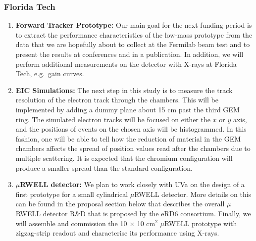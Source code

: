 \subsubsection{Florida Tech} 
\begin{enumerate}
\item \textbf{Forward Tracker Prototype:} Our main goal for the next funding period is to extract the performance characteristics of the low-mass prototype from the data that we are hopefully about to collect at the Fermilab beam test and to present the results at conferences and in a publication. In addition, we will perform additional measurements on the detector with X-rays at Florida Tech, e.g.\ gain curves.
%
\item \textbf{EIC Simulations:} The next step in this study is to measure the track resolution of the electron track through the chambers. This will be implemented by adding a dummy plane about 15 cm past the third GEM ring. The simulated electron tracks will be focused on either the $x$ or $y$ axis, and the positions of events on the chosen axis will be histogrammed. In this fashion, one will be able to tell how the reduction of material in the GEM chambers affects the spread of position values read after the chambers due to multiple scattering. It is expected that the chromium configuration will produce a smaller spread than the standard configuration.
%
\item \textbf{$\mu$RWELL detector:} We plan to work closely with UVa on the design of a first prototype for a small cylindrical $\mu$RWELL detector. More details on this can be found in the proposal section below that describes the overall $\mu$RWELL detector R\&D that is proposed by the eRD6 consortium. Finally, we will assemble and commission the 10 $\times$ 10 cm$^2$ $\mu$RWELL prototype with zigzag-strip readout and characterise its performance using X-rays.
\end{enumerate}
